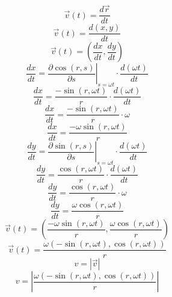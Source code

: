 \documentclass[a4paper,12pt]{report}
\begin{document}
\begin{equation}
\vec{v}(t) = \frac{d \vec{r}}{dt}
\end{equation}
\begin{equation}
\vec{v}(t) = \frac{d (x,y)}{dt}
\end{equation}
\begin{equation}
\vec{v}(t) = \left(\frac{dx}{dt},\frac{dy}{dt}\right)
\end{equation}
\begin{equation}
\frac{dx}{dt} = \left.\frac{\partial \cos(r,s)}{\partial s}\right|_{s = \omega t} \cdot \frac{d (\omega t)}{dt}
\end{equation}
\begin{equation}
\frac{dx}{dt} = \frac{-\sin(r,\omega t)}{r} \cdot \frac{d (\omega t)}{dt}
\end{equation}
\begin{equation}
\frac{dx}{dt} = \frac{-\sin(r,\omega t)}{r} \cdot \omega
\end{equation}
\begin{equation}
\frac{dx}{dt} = \frac{-\omega \sin(r,\omega t)}{r}
\end{equation}
\begin{equation}
\frac{dy}{dt} = \left.\frac{\partial \sin(r,s)}{\partial s}\right|_{s = \omega t} \cdot \frac{d (\omega t)}{dt}
\end{equation}
\begin{equation}
\frac{dy}{dt} = \frac{\cos(r,\omega t)}{r} \cdot \frac{d (\omega t)}{dt}
\end{equation}
\begin{equation}
\frac{dy}{dt} = \frac{\cos(r,\omega t)}{r} \cdot \omega
\end{equation}
\begin{equation}
\frac{dy}{dt} = \frac{\omega \cos(r,\omega t)}{r}
\end{equation}
\begin{equation}
\vec{v}(t) = \left(\frac{-\omega \sin(r,\omega t)}{r},\frac{\omega \cos(r,\omega t)}{r}\right)
\end{equation}
\begin{equation}
\vec{v}(t) = \frac{\omega \left(-\sin(r,\omega t),\cos(r,\omega t)\right)}{r}
\end{equation}
\begin{equation}
v = \left|\vec{v}\right|
\end{equation}
\begin{equation}
v = \left|\frac{\omega \left(-\sin(r,\omega t),\cos(r,\omega t)\right)}{r}\right|
\end{equation}
\end{document}
